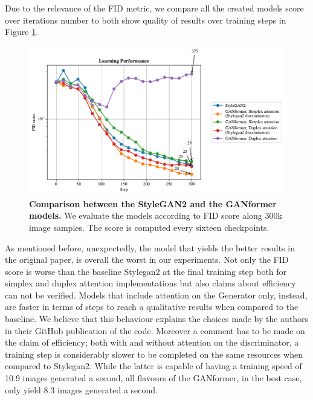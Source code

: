 \documentclass{article}
\begin{document}
	Due to the relevance of the FID metric, we compare all the created models score over iterations 
	number to both show quality of results over training steps in Figure \ref{fig:performance}.
	\begin{figure}[htpb]				
		\centering
		\raggedleft
		\includegraphics[width=.8\linewidth]{../src/trained_network/out_imgs/FIDscore.pdf}
		\caption{\textbf{Comparison between the StyleGAN2 and the GANformer models.} We evaluate 
		the models according to FID score along 300k image samples. The score is computed every 
		sixteen checkpoints.}
		\label{fig:performance}
	\end{figure}
	
	As mentioned before, unexpectedly, the model that yields the better results in the original paper, is overall the worst in our experiments.
	Not only the FID score is worse than the baseline Stylegan2 at the final training step both for simplex and duplex attention implementations but also claims about efficiency can not be verified.
	Models that include attention on the Generator only, instead, are faster in terms of steps to reach a qualitative results when compared to the baseline.
	We believe that this behaviour explains the choices made by the authors in their GitHub publication of the code.
	Moreover a comment has to be made on the claim of efficiency; both with and without attention on the discriminator, a training step is considerably slower to be completed on the same resources when compared to Stylegan2.
	While the latter is capable of having a training speed of 10.9 images generated a second, all flavours of the GANformer, in the best case, only yield 8.3 images generated a second.
	
\end{document}
